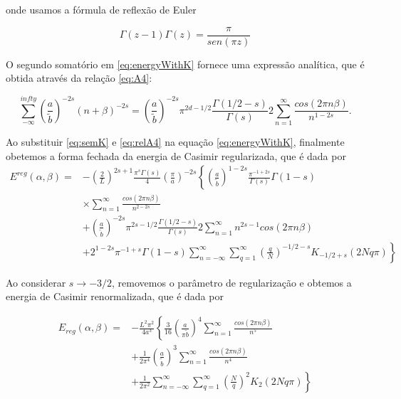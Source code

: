 onde usamos a fórmula de reflexão de Euler

\begin{equation}
    \Gamma(z-1) \Gamma(z) = \frac{\pi}{sen(\pi z)} \label{eq:reflectionFormula}
\end{equation}

O segundo somatório em \eqref{eq:energyWithK} fornece uma expressão analítica, que é obtida através da relação \eqref{eq:A4}:

\begin{equation}
    \sum_{-\infty}^{infty} \left( \frac{a}{\tilde{b}} \right)^{-2s} (n+\beta)^{-2s} = \left( \frac{a}{\tilde{b}} \right)^{-2s} \pi^{2d-1/2} \frac{\Gamma(1/2 - s)}{\Gamma(s)} 2 \sum_{n=1}^\infty \frac{cos(2\pi n \beta)}{n^{1-2s}}. \label{eq:relA4}
\end{equation}

Ao substituir \eqref{eq:semK} e \eqref{eq:relA4} na equação \eqref{eq:energyWithK}, finalmente obetemos a forma fechada da energia de Casimir regularizada, que é dada por
\begin{equation}
    \begin{aligned}
    E^{reg} (\alpha,\beta) =& -\left( \frac{2}{L} \right)^{2s+1} \frac{\pi^s \Gamma(s)}{4} \left( \frac{\pi}{a} \right)^{-2s} \left\{ \left( \frac{a}{\tilde{b}} \right)^{1-2s} \frac{\pi^{-1+2s}}{\Gamma(s)} \Gamma(1-s) \right. \\
    & \times \left.  \sum_{n=1}^{\infty} \frac{cos(2\pi n \beta)}{n^{2-2s}} \right. \\ 
    &+ \left. \left( \frac{a}{\tilde{b}} \right)^{-2s} \pi^{2s-1/2} \frac{\Gamma(1/2 - s)}{\Gamma(s)} 2 \sum_{n=1}^{\infty} n^{2s-1} cos(2\pi n \beta) \right. \\
    &+ \left. 2^{1-2s} \pi^{-1+s} \Gamma(1-s) \sum_{n=-\infty}^{\infty} \sum_{q=1}^{\infty} \left( \frac{q}{N} \right)^{-1/2 -s} K_{-1/2 + s} (2Nq \pi) \right\}
    \end{aligned}
\end{equation}

Ao considerar $s \to -3/2$, removemos o parâmetro de regularização e obtemos a energia de Casimir renormalizada, que é dada por

\begin{equation}
    \begin{aligned}
        E_{reg} (\alpha, \beta) =& - \frac{L^2 \pi^2}{4a^3} \left\{ \frac{3}{16} \left( \frac{a}{\pi \tilde{b}} \right)^4 \sum_{n=1}^{\infty} \frac{cos(2\pi n \beta)}{n^5} \right. \\
        &+ \left. \frac{1}{2\pi^4} \left( \frac{a}{\tilde{b}} \right)^3 \sum_{n=1}^{\infty} \frac{cos(2\pi n \beta)}{n^4} \right. \\ 
        &+ \left. \frac{1}{2\pi^2} \sum_{n=-\infty}^{\infty} \sum_{q=1}^{\infty} \left( \frac{N}{q} \right)^2 K_2 (2Nq\pi) \right\} \label{eq:normalizedCasimirEnergy}
    \end{aligned}
\end{equation}

